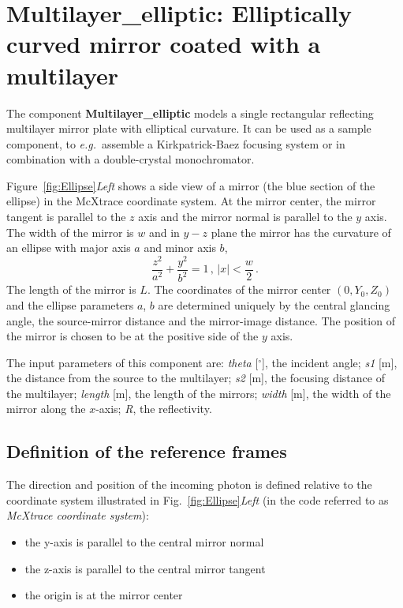 \section{Multilayer\_elliptic: Elliptically curved mirror coated with a multilayer}
\label{s:mirror}



The component \textbf{Multilayer\_elliptic}
models a single rectangular reflecting multilayer mirror plate with elliptical curvature. It can be used
as a sample component, to \textit{e.g.}~assemble a Kirkpatrick-Baez focusing system 
or in combination with a double-crystal monochromator.


Figure~\ref{fig:Ellipse}\emph{Left} shows a side view of a mirror
(the blue section of the ellipse) in the McXtrace coordinate system.
At the mirror center, the mirror tangent is parallel to the $z$ axis
and the mirror normal is parallel to the $y$ axis. The width of the
mirror is $w$ and in $y-z$ plane the mirror has the curvature of an
ellipse with major axis $a$ and minor axis $b$,
%
\begin{equation} 
\frac{z^2}{ a^2} + \frac{y^2}{b^2} =1\,, \,|x| <
\frac{w}{2}\,.
\end{equation}
%
The length of the mirror is $L$. The coordinates of the mirror
center $(0,Y_0,Z_0)$ and the ellipse parameters $a$, $b$ are
determined uniquely by the central glancing angle, the source-mirror
distance and the mirror-image distance. The position of the mirror
is chosen to be at the positive side of the $y$ axis.

The input parameters of this component are:
\textit{theta} [$^{\circ}$], the incident angle; 
\textit{s1} [m], the distance from the source to the multilayer;
\textit{s2} [m], the focusing distance of the multilayer;
\textit{length} [m], the length of the mirrors;
\textit{width} [m], the width of the mirror along the $x$-axis;
\textit{R}, the reflectivity.

\subsection{Definition of the reference frames}
The direction and position of the incoming photon is defined
relative to the coordinate system illustrated in
Fig.~\ref{fig:Ellipse}\emph{Left} (in the code referred to as
\emph{McXtrace coordinate system}):
\begin{itemize}
\item the y-axis is parallel to the central mirror normal
\item the z-axis is parallel to the central mirror tangent
\item the origin is at the mirror center
\end{itemize}

